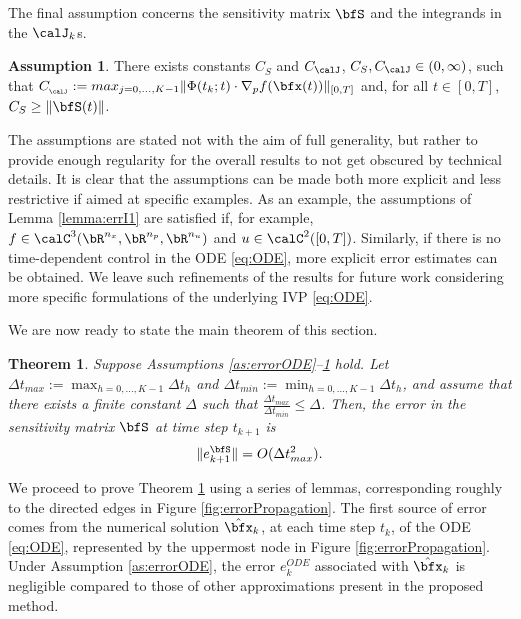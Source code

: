 \documentclass[DIV=12]{scrartcl} %
\newcommand{\err}{\ensuremath{e}}
\newtheorem{theorem}{Theorem}
\theoremstyle{definition}
\newtheorem{assumption}{Assumption}
\begin{document}
The final assumption concerns the sensitivity matrix $\bfS$ and the integrands in the $\calJ _k$s. 
\begin{assumption}
\label{as:matrices}
There exists constants $C_S$ and $C_{\calJ}$, $C_S, C_\calJ \in (0,\infty)$, such that $C_{_\calJ}:=max_{j=0,\dots,K-1}\|\Phi(t_k;t)\cdot\nabla_pf(\bfx(t))\|_{[0,T]}$ and, for all $t \in [0,T]$, $C_S \geq \| \bfS (t) \|$.
\end{assumption}

The assumptions are stated not with the aim of full generality, but rather to provide enough regularity for the overall results to not get obscured by technical details. It is clear that the assumptions can be made both more explicit and less restrictive if aimed at specific examples. As an example, the assumptions of Lemma \ref{lemma:errI1} are satisfied if, for example, $f\in\calC^3(\bR^{n_x},\bR^{n_p},\bR^{n_u})$ and $u\in\calC^2([0,T])$. Similarly, if there is no time-dependent control in the ODE \eqref{eq:ODE}, more explicit error estimates can be obtained. We leave such refinements of the results for future work considering more specific formulations of the underlying IVP \eqref{eq:ODE}.

We are now ready to state the main theorem of this section.
\begin{theorem}
\label{thm:error}
Suppose Assumptions \ref{as:errorODE}–\ref{as:matrices} hold. Let $\Delta t_{max}:=\max_{h=0,\dots,K-1}\Delta t_h$ and $\Delta t_{min}:=\min_{h=0,\dots,K-1}\Delta t_h$, and assume that there exists a finite constant $\Delta$ such that $\frac{\Delta t_{max}}{\Delta t_{min}}\le \Delta$. Then, the error in the sensitivity matrix $\bfS$ at time step $t_{k+1}$ is
\begin{equation}
    \label{errSOrder}
    \|\err_{k+1}^{\bfS}\|=O(\Delta t_{max}^2).
\end{equation}
\end{theorem}

We proceed to prove Theorem \ref{thm:error} using a series of lemmas, corresponding roughly to the directed edges in Figure \ref{fig:errorPropagation}. The first source of error comes from the numerical solution $\hat{\bfx}_k$, at each time step $t_k$, of the ODE \eqref{eq:ODE}, represented by the uppermost node in Figure \ref{fig:errorPropagation}. Under Assumption \ref{as:errorODE}, the error $\err^{ODE}_{k}$ associated with $\hat \bfx _k$ is negligible compared to those of other approximations present in the proposed method.  
\end{document}
